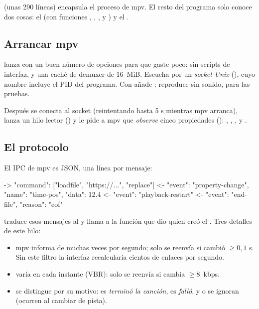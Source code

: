  (unas 290 líneas) encapsula el proceso de mpv. El resto del programa
solo conoce dos cosas: el  (con funciones , ,
,  y ) y el .

\subsection{Arrancar mpv}

 lanza  con un buen número de
opciones para que gaste poco: sin scripts de interfaz,  y una caché de
demuxer de 16~MiB. Escucha por un \emph{socket Unix} (), cuyo
nombre incluye el PID del programa. Con  añade : reproduce
sin sonido, para las pruebas.

Después se conecta al socket (reintentando hasta 5 s mientras mpv arranca), lanza un hilo
lector () y le pide a mpv que \emph{observe} cinco propiedades
(): , , , 
y .

\subsection{El protocolo}

El IPC de mpv es JSON, una línea por mensaje:

\begin{codigo}
-> {"command": ["loadfile", "https://...", "replace"]}
<- {"event": "property-change", "name": "time-pos", "data": 12.4}
<- {"event": "playback-restart"}
<- {"event": "end-file", "reason": "eof"}
\end{codigo}

 traduce esos mensajes al   y llama a la función  que dio quien
creó el . Tres detalles de este hilo:

\begin{itemize}
  \item mpv informa de  muchas veces por segundo; solo se reenvía si cambió
  $\ge 0{,}1$ s. Sin este filtro la interfaz recalcularía cientos de enlaces por segundo.
  \item {} varía en cada instante (VBR): solo se reenvía si cambia $\ge 8$~kbps.
  \item {} se distingue por su motivo:  es \emph{terminó la canción},
   es \emph{falló}, y  o  se ignoran (ocurren al cambiar de
  pista).
\end{itemize}

